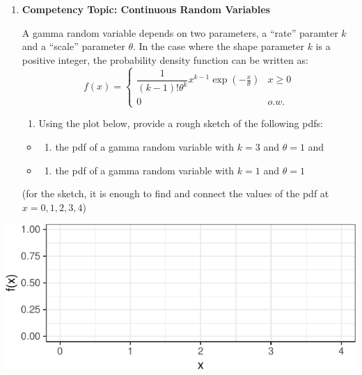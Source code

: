 \documentclass[11pt]{article}
\providecommand{\tightlist}{%
  \setlength{\itemsep}{0pt}\setlength{\parskip}{0pt}}
\begin{document}
\begin{enumerate}
\def\labelenumi{\arabic{enumi}.}
\setcounter{enumi}{1}
\item
  \textbf{Competency Topic: Continuous Random Variables}

  A gamma random variable depends on two parameters, a ``rate'' paramter
  \(k\) and a ``scale'' parameter \(\theta\). In the case where the
  shape parameter \(k\) is a positive integer, the probability density
  function can be written as:
  \[f(x) = \begin{cases} \dfrac{1}{(k-1)! \theta^k} x^{k-1} \exp\left(-\frac{x}{\theta}\right) & x \ge 0 \\ 0 & o.w. \end{cases}\]

  \begin{enumerate}
  \def\labelenumii{\alph{enumii}.}
  \tightlist
  \item
    Using the plot below, provide a rough sketch of the following pdfs:
  \end{enumerate}

  \begin{itemize}
  \item
    \begin{enumerate}
    \def\labelenumii{(\arabic{enumii})}
    \tightlist
    \item
      the pdf of a gamma random variable with \(k = 3\) and \(\theta=1\)
      and
    \end{enumerate}
  \item
    \begin{enumerate}
    \def\labelenumii{(\arabic{enumii})}
    \setcounter{enumii}{1}
    \tightlist
    \item
      the pdf of a gamma random variable with \(k = 1\) and \(\theta=1\)
    \end{enumerate}
  \end{itemize}

  (for the sketch, it is enough to find and connect the values of the
  pdf at \(x = 0, 1, 2, 3, 4\))
\end{enumerate}

\begin{center}\includegraphics[width=.9\linewidth,height=.4\linewidth]{stat305-cq3_files/figure-latex/unnamed-chunk-2-1} \end{center}
   \vspace{3cm}
\end{document}
